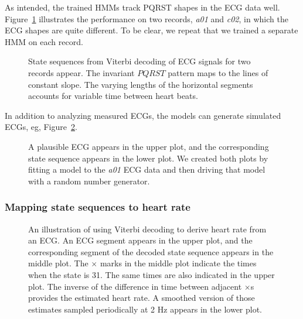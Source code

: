 As intended, the trained HMMs track PQRST shapes in the ECG data well.
Figure~\ref{fig:a01c02_states} illustrates the performance on two
records, \emph{a01} and \emph{c02}, in which the ECG shapes are quite
different.  To be clear, we repeat that we trained a separate HMM on
each record.
\begin{figure}
  \caption[Decoded state sequences]{State sequences from Viterbi
    decoding of ECG signals for two records appear.  The invariant
    $PQRST$ pattern maps to the lines of constant slope.  The varying
    lengths of the horizontal segments accounts for variable time
    between heart beats.}
  \label{fig:a01c02_states}
\end{figure}

In addition to analyzing measured ECGs, the models can generate
simulated ECGs, eg, Figure~\ref{fig:simulated}.
\begin{figure}
  \caption[Simulated ECG]{A plausible ECG appears in the upper plot,
    and the corresponding state sequence appears in the lower plot.
    We created both plots by fitting a model to the \emph{a01} ECG
    data and then driving that model with a random number generator.}
  \label{fig:simulated}
\end{figure}

\subsubsection{Mapping state sequences to heart rate}
\label{sec:states2hr}

\begin{figure}
  \caption[Heart rate derived from ECG.]{An illustration of using
    Viterbi decoding to derive heart rate from an ECG.  An ECG segment
    appears in the upper plot, and the corresponding segment of the
    decoded state sequence appears in the middle plot.  The $\times$
    marks in the middle plot indicate the times when the state is 31.
    The same times are also indicated in the upper plot.  The inverse
    of the difference in time between adjacent $\times$s provides the
    estimated heart rate.  A smoothed version of those estimates
    sampled periodically at 2 Hz appears in the lower plot. }
  \label{fig:ecg2hr}
\end{figure}

